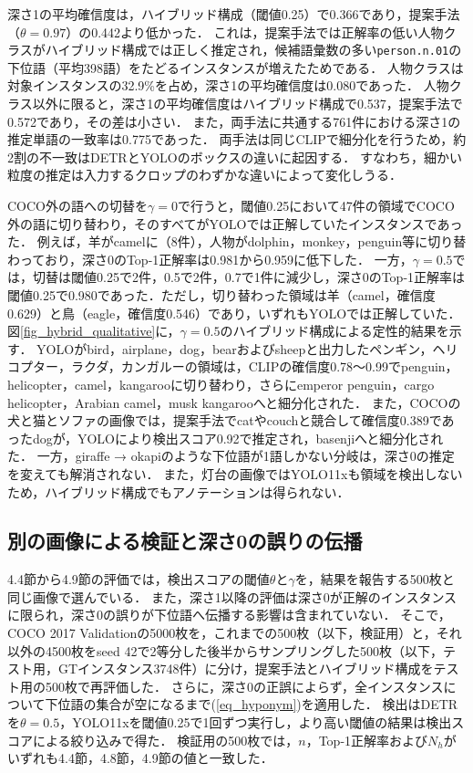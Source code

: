 深さ1の平均確信度は，ハイブリッド構成（閾値0.25）で0.366であり，提案手法（$ \theta = 0.97 $）の0.442より低かった．
これは，提案手法では正解率の低い人物クラスがハイブリッド構成では正しく推定され，候補語彙数の多い\texttt{person.n.01}の下位語（平均398語）をたどるインスタンスが増えたためである．
人物クラスは対象インスタンスの32.9\%を占め，深さ1の平均確信度は0.080であった．
人物クラス以外に限ると，深さ1の平均確信度はハイブリッド構成で0.537，提案手法で0.572であり，その差は小さい．
また，両手法に共通する761件における深さ1の推定単語の一致率は0.775であった．
両手法は同じCLIPで細分化を行うため，約2割の不一致はDETRとYOLOのボックスの違いに起因する．
すなわち，細かい粒度の推定は入力するクロップのわずかな違いによって変化しうる．

COCO外の語への切替を$ \gamma = 0 $で行うと，閾値0.25において47件の領域でCOCO外の語に切り替わり，そのすべてがYOLOでは正解していたインスタンスであった．
例えば，羊がcamelに（8件），人物がdolphin，monkey，penguin等に切り替わっており，深さ0のTop-1正解率は0.981から0.959に低下した．
一方，$ \gamma = 0.5 $では，切替は閾値0.25で2件，0.5で2件，0.7で1件に減少し，深さ0のTop-1正解率は閾値0.25で0.980であった．ただし，切り替わった領域は羊（camel，確信度0.629）と鳥（eagle，確信度0.546）であり，いずれもYOLOでは正解していた．
図\ref{fig_hybrid_qualitative}に，$ \gamma = 0.5 $のハイブリッド構成による定性的結果を示す．
YOLOがbird，airplane，dog，bearおよびsheepと出力したペンギン，ヘリコプター，ラクダ，カンガルーの領域は，CLIPの確信度0.78〜0.99でpenguin，helicopter，camel，kangarooに切り替わり，さらにemperor penguin，cargo helicopter，Arabian camel，musk kangarooへと細分化された．
また，COCOの犬と猫とソファの画像では，提案手法でcatやcouchと競合して確信度0.389であったdogが，YOLOにより検出スコア0.92で推定され，basenjiへと細分化された．
一方，giraffe → okapiのような下位語が1語しかない分岐は，深さ0の推定を変えても解消されない．
また，灯台の画像ではYOLO11xも領域を検出しないため，ハイブリッド構成でもアノテーションは得られない．

\subsection{別の画像による検証と深さ0の誤りの伝播}
4.4節から4.9節の評価では，検出スコアの閾値$ \theta $と$ \gamma $を，結果を報告する500枚と同じ画像で選んでいる．
また，深さ1以降の評価は深さ0が正解のインスタンスに限られ，深さ0の誤りが下位語へ伝播する影響は含まれていない．
そこで，COCO 2017 Validationの5000枚を，これまでの500枚（以下，検証用）と，それ以外の4500枚をseed 42で2等分した後半からサンプリングした500枚（以下，テスト用，GTインスタンス3748件）に分け，提案手法とハイブリッド構成をテスト用の500枚で再評価した．
さらに，深さ0の正誤によらず，全インスタンスについて下位語の集合が空になるまで(\ref{eq_hyponym})を適用した．
検出はDETRを$ \theta = 0.5 $，YOLO11xを閾値0.25で1回ずつ実行し，より高い閾値の結果は検出スコアによる絞り込みで得た．
検証用の500枚では，$ n $，Top-1正解率および$ N_h $がいずれも4.4節，4.8節，4.9節の値と一致した．

